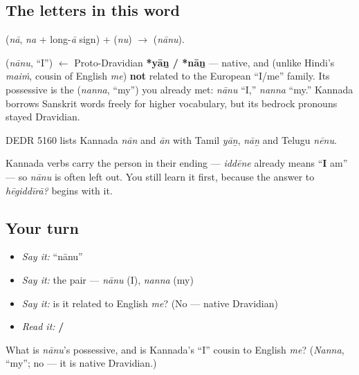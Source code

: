 \subsection*{The letters in this word}
\textbf{} (\emph{nā}, \emph{na} + long-\emph{ā} sign) + \textbf{} (\emph{nu}) $\to$ \textbf{} (\emph{nānu}).

\begin{cousinweb}
\textbf{} (\emph{nānu}, \textquotedblleft{}I\textquotedblright{}) $\leftarrow$ Proto-Dravidian \textbf{*yāṉ / *nāṉ} — native, and (unlike Hindi's \emph{maiṁ}, cousin of English \emph{me}) \textbf{not} related to the European \textquotedblleft{}I/me\textquotedblright{} family. Its possessive is the \textbf{} (\emph{nanna}, \textquotedblleft{}my\textquotedblright{}) you already met: \emph{nānu} \textquotedblleft{}I,\textquotedblright{} \emph{nanna} \textquotedblleft{}my.\textquotedblright{} Kannada borrows Sanskrit words freely for higher vocabulary, but its bedrock pronouns stayed Dravidian.

DEDR 5160 lists Kannada \emph{nān} and \emph{ān} with Tamil \emph{yāṉ}, \emph{nāṉ} and Telugu \emph{nēnu}.
\end{cousinweb}

\begin{grammarlens}[title={Grammar Lens: \textquotedblleft{}I\textquotedblright{} you can drop}]
Kannada verbs carry the person in their ending — \emph{iddēne} already means \textquotedblleft{}\textbf{I} am\textquotedblright{} — so \emph{nānu} is often left out. You still learn it first, because the answer to \emph{hēgiddīrā?} begins with it.
\end{grammarlens}

\subsection*{Your turn}
\begin{itemize}
\raggedright
  \item \emph{Say it:} \textquotedblleft{}nānu\textquotedblright{}
  \item \emph{Say it:} the pair — \emph{nānu} (I), \emph{nanna} (my)
  \item \emph{Say it:} is it related to English \emph{me}? (No — native Dravidian)
  \item \emph{Read it:} \textbf{ / }
\end{itemize}

\begin{tcolorbox}[breakable,colback=teal!4,colframe=teal!35!black,title={Before you move on}]
What is \emph{nānu}'s possessive, and is Kannada's \textquotedblleft{}I\textquotedblright{} cousin to English \emph{me}? (\emph{Nanna}, \textquotedblleft{}my\textquotedblright{}; no — it is native Dravidian.)
\end{tcolorbox}
